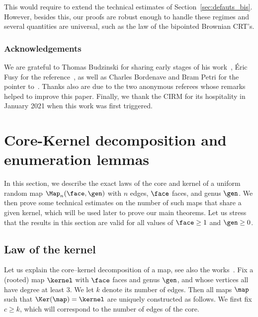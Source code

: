 This would require to extend the technical estimates of Section~\ref{sec:defauts_bis}. However, besides this, our proofs are robust enough to handle these regimes and several quantities are universal, such as the law of the bipointed Brownian CRT's.

\subsubsection*{Acknowledgements}
We are grateful to Thomas Budzinski for sharing early stages of his work~\cite{Bud21}, \'Eric Fusy for the reference~\cite{BCR93}, as well as Charles Bordenave and Bram Petri for the pointer to~\cite[Th.\,2.19]{Wor99}.
Thanks also are due to the two anonymous referees whose remarks helped to improve this paper.
Finally, we thank the CIRM for its hospitality in January 2021 when this work was first triggered.

\section{Core-Kernel decomposition and enumeration lemmas}
\label{sec:enumeration}

In this section, we describe the exact laws of the core and kernel of a uniform random map $ \Map_n(\face,\gen)$ with $n$ edges, $\face$ faces, and genus $\gen$. We then prove some technical estimates on the number of such maps that share a given kernel, which will be used later to prove our main theorems.
Let us stress that the results in this section are valid for
all values of $\face \ge 1$ and $\gen \ge 0$.

\subsection{Law of the kernel}
\label{sec:decomposition}

Let us explain
the core--kernel decomposition of a map, see also the works~\cite{CMS09,Cha10}. Fix a (rooted) map $\kernel$ with $\face$ faces and genus $\gen$, and whose vertices all have degree at least $3$. We let $k$ denote its number of edges. Then all maps $\map$ such that $ \Ker(\map) = \kernel$ are uniquely constructed as follows. We first fix $c \geq k$, which will correspond to the number of edges of the core.

